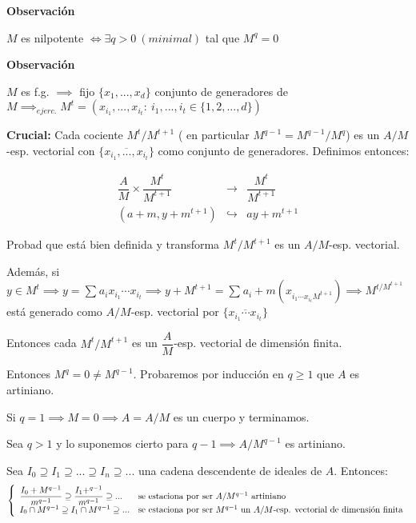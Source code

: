 \documentclass[openany]{book}
\begin{document}
\begin{demonstration}
    \begin{flushright}
        \textbf{Observación}
    \end{flushright}
    $ M $ es nilpotente $ \iff \exists q > 0\ (minimal)$ tal que $ M^{q} = 0 $
    
    \begin{flushright}
    \textbf{Observación}
\end{flushright}

$ M $ es f.g. $ \implies $ fijo $ \{x_1,...,x_{d}\} $ conjunto de generadores de $ M \implies_{ejerc.} M^{t} = (x_{i_1},...,x_{i_{t}}:\ i_1,...,i_{t} \in \{1,2,...,d\})$

\textbf{Crucial:} Cada cociente $ M^{t} / M^{t+1} $ ( en particular $ M^{q-1} = M^{q-1} / M^{q} $) es un $ A /M $-esp. vectorial con $ \{\overline{x_{i_1},...,x_{i_{t}}}\} $ como conjunto de generadores. Definimos entonces:

$$ 
\begin{aligned}
    \dfrac{A}{M} \times \dfrac{M^{t}}{M^{t+1}} &  \to &  \dfrac{M^{t}}{M^{t+1}}\\
    (a+m,y+m^{t+1}) & \hookrightarrow & ay+m^{t+1}
\end{aligned}
$$

Probad que está bien definida y transforma $ M^{t} / M^{t+1} $ es un $ A /M $-esp. vectorial.

Además, si $ y \in M^{t} \implies y= \sum\limits_{}^{}a_ix_{i_1}\cdots x_{i_{t}} \implies y+M^{t+1} = \sum\limits_{}^{} a_{i}+m (x_{i_{1}\cdots x_{i_{t}}M^{t+1}}) \implies M^{t / M^{t+1}}$ está generado como $ A / M  $-esp. vectorial por $ \{\overline{x_{i_1}\cdots x_{i_{t}}}\} $

Entonces cada $ M^{t} / M^{t+1} $ es un $ \dfrac{A}{M} $-esp. vectorial de dimensión finita.

Entonces $ M^{q} = 0 \ne M^{q-1} $. Probaremos por inducción en $ q\geq  1 $ que $ A  $ es artiniano.

Si $ q = 1 \implies M = 0 \implies A = A / M  $ es un cuerpo y terminamos.

Sea $ q > 1 $ y lo suponemos cierto para $ q -1 \implies A /M^{q-1}$ es artiniano.

Sea $ I_0 \supseteq I_1 \supseteq ... \supseteq I_n \supseteq...$ una cadena descendente de ideales de $ A $. Entonces:
$$ \left\{
\begin{array}{ll}
    \dfrac{I_0+M^{q-1}}{m^{q-1}} \supseteq \dfrac{I_1+^{q-1}}{m^{q-1}} \supseteq ...& \text{se estaciona por ser $ A / M^{q-1} $ artiniano}\\ 
    I_0 \cap M^{q-1} \supseteq I_1 \cap M^{q-1 } \supseteq ... & \text{se estaciona por ser $  M^{q-1}$ un $ A /M $-esp. vectorial de dimensión finita}
\end{array}
\right. $$


\end{demonstration}
\end{document}

